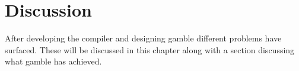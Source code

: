 \chapter{Discussion}
After developing the compiler and designing \gls{gamble} different problems have surfaced.
These will be discussed in this chapter along with a section discussing what \gls{gamble} has achieved.


